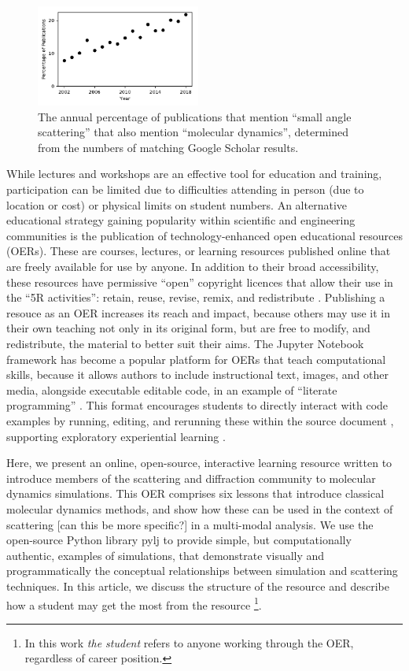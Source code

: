 \documentclass[amsmath,amssymb,twocolumn,superscriptaddress]{revtex4-1}
\begin{document}
%
\begin{figure}
\label{fig:growth}
\includegraphics[width=0.48\textwidth]{figures/chem_data_py.pdf}
\caption{The annual percentage of publications that mention ``small angle scattering'' that also mention ``molecular dynamics'', determined from the numbers of matching Google Scholar results.}
\end{figure}
%

While lectures and workshops are an effective tool for education and training, participation can be limited due to difficulties attending in person (due to location or cost) or physical limits on student numbers.
An alternative educational strategy  gaining popularity within scientific and engineering communities is the publication of technology-enhanced open educational resources (OERs).
These are courses, lectures, or learning resources published online that are freely available for use by anyone. In addition to their broad accessibility, these resources have permissive ``open'' copyright licences that allow their use in the ``5R activities'': retain, reuse, revise, remix, and redistribute \cite{wiley_open_2018}.
Publishing a resouce as an OER increases its reach and impact, because others may use it in their own teaching not only in its original form, but are free to modify, and redistribute, the material to better suit their aims.
The Jupyter Notebook framework \cite{kluyver_jupyter_2016} has become a popular platform for OERs that teach computational skills, because it allows authors to include instructional text, images, and other media, alongside executable editable code, in an example of ``literate programming'' \cite{knuth_literate_1984}.
This format encourages students to directly interact with code examples by running, editing, and rerunning these within the source document \cite{barba_cybertraining_2017}, supporting exploratory experiential learning \cite{Papert_Mindstorms1993}.

Here, we present an online, open-source, interactive learning resource written to introduce members of the scattering and diffraction community to molecular dynamics simulations.
This OER comprises six lessons that introduce classical molecular dynamics methods, and show how these can be used in the context of scattering [can this be more specific?] in a multi-modal analysis.
We use the open-source Python library pylj \cite{mccluskey_pylj_2018} to provide simple, but computationally authentic, examples of simulations, that demonstrate visually and programmatically the conceptual relationships between simulation and scattering techniques.
In this article, we discuss the structure of the resource and describe how a student may get the most from the resource \footnote{In this work \emph{the student} refers to anyone working through the OER, regardless of career position.}.
\end{document}
